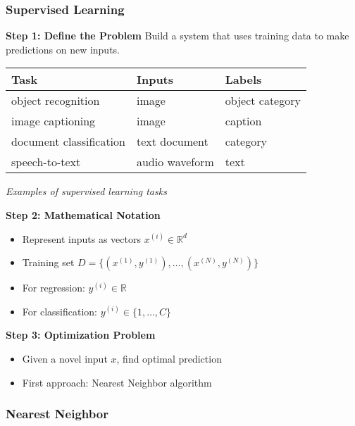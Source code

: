 \documentclass{article}
\begin{document}
\subsubsection*{Supervised Learning}

\begin{tcolorbox}[colback=gray!10!white,colframe=navyblue!70!black,title=Supervised Learning: Step-by-Step]

\textbf{Step 1: Define the Problem}
Build a system that uses training data to make predictions on new inputs.

\centering
\begin{tabular}{|l|l|l|}
\hline
\textbf{Task} & \textbf{Inputs} & \textbf{Labels} \\
\hline
object recognition & image & object category \\
image captioning & image & caption \\
document classification & text document & category \\
speech-to-text & audio waveform & text \\
\hline
\end{tabular}
\par\smallskip
\textit{Examples of supervised learning tasks}
\par
\raggedright

\textbf{Step 2: Mathematical Notation}
\begin{itemize}
  \item Represent inputs as vectors $x^{(i)} \in \mathbb{R}^d$
  \item Training set $D = \{(x^{(1)}, y^{(1)}), \ldots, (x^{(N)}, y^{(N)})\}$
  \item For regression: $y^{(i)} \in \mathbb{R}$
  \item For classification: $y^{(i)} \in \{1,\ldots,C\}$
\end{itemize}

\textbf{Step 3: Optimization Problem}
\begin{itemize}
  \item Given a novel input $x$, find optimal prediction
  \item First approach: Nearest Neighbor algorithm
\end{itemize}

\end{tcolorbox}

\subsubsection*{Nearest Neighbor}
\end{document}
